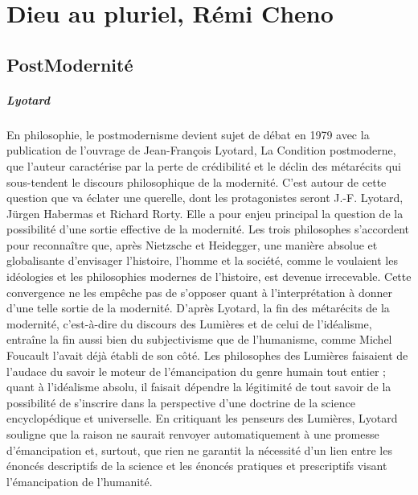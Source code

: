 \chapter{Dieu au pluriel, Rémi Cheno}

\section{PostModernité}

\paragraph{Lyotard} En philosophie, le postmodernisme devient sujet de débat en 1979 avec la publication de l'ouvrage de Jean-François Lyotard, La Condition postmoderne, que l'auteur caractérise par la perte de crédibilité et le déclin des métarécits qui sous-tendent le discours philosophique de la modernité. C'est autour de cette question que va éclater une querelle, dont les protagonistes seront J.-F. Lyotard, Jürgen Habermas et Richard Rorty. Elle a pour enjeu principal la question de la possibilité d'une sortie effective de la modernité. Les trois philosophes s'accordent pour reconnaître que, après Nietzsche et Heidegger, une manière absolue et globalisante d'envisager l'histoire, l'homme et la société, comme le voulaient les idéologies et les philosophies modernes de l'histoire, est devenue irrecevable. Cette convergence ne les empêche pas de s'opposer quant à l'interprétation à donner d'une telle sortie de la modernité. D'après Lyotard, la fin des métarécits de la modernité, c'est-à-dire du discours des Lumières et de celui de l'idéalisme, entraîne la fin aussi bien du subjectivisme que de l'humanisme, comme Michel Foucault l'avait déjà établi de son côté. Les philosophes des Lumières faisaient de l'audace du savoir le moteur de l'émancipation du genre humain tout entier ; quant à l'idéalisme absolu, il faisait dépendre la légitimité de tout savoir de la possibilité de s'inscrire dans la perspective d'une doctrine de la science encyclopédique et universelle. En critiquant les penseurs des Lumières, Lyotard souligne que la raison ne saurait renvoyer automatiquement à une promesse d'émancipation et, surtout, que rien ne garantit la nécessité d'un lien entre les énoncés descriptifs de la science et les énoncés pratiques et prescriptifs visant l'émancipation de l'humanité. 

